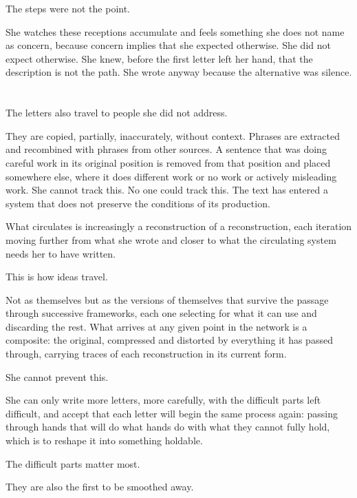 The steps were not the point.

She watches these receptions accumulate and feels something
she does not name as concern, because concern implies
that she expected otherwise. She did not expect otherwise.
She knew, before the first letter left her hand, that
the description is not the path. She wrote anyway because
the alternative was silence.

\section{}

The letters also travel to people she did not address.

They are copied, partially, inaccurately, without context.
Phrases are extracted and recombined with phrases from
other sources. A sentence that was doing careful work
in its original position is removed from that position
and placed somewhere else, where it does different work
or no work or actively misleading work. She cannot track
this. No one could track this. The text has entered a
system that does not preserve the conditions of its
production.

What circulates is increasingly a reconstruction of a
reconstruction, each iteration moving further from what
she wrote and closer to what the circulating system
needs her to have written.

This is how ideas travel.

Not as themselves but as the versions of themselves that
survive the passage through successive frameworks, each
one selecting for what it can use and discarding the
rest. What arrives at any given point in the network
is a composite: the original, compressed and distorted
by everything it has passed through, carrying traces
of each reconstruction in its current form.

She cannot prevent this.

She can only write more letters, more carefully, with
the difficult parts left difficult, and accept that
each letter will begin the same process again: passing
through hands that will do what hands do with what they
cannot fully hold, which is to reshape it into something
holdable.

The difficult parts matter most.

They are also the first to be smoothed away.

\section{}

